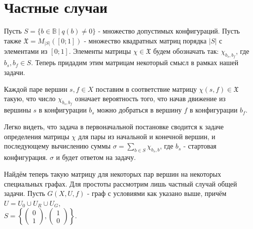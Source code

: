 \section*{Частные случаи}
\par Пусть $S =\{b \in \mathbb{B}\ |\ q(b)\ne 0\}$ - множество допустимых конфигураций. Пусть также $\mathfrak{X} = M_{|S|}([0;1])$ - множество квадратных матриц порядка $|S|$ с элементами из $[0;1]$. Элементы матрицы $\chi \in \mathfrak{X}$ будем обозначать так: $\chi_{b_s,b_f}$, где $b_s, b_f \in S$. Теперь придадим этим матрицам некоторый смысл в рамках нашей задачи. 
\par Каждой паре вершин $s, f \in X$ поставим в соответствие матрицу $\chi(s,f) \in \mathfrak{X}$ такую, что число $\chi_{b_s,b_f}$ означает вероятность того, что начав движение из вершины $s$ в конфигурации $b_s$ можно добраться в вершину $f$ в конфигурации $b_f$. 
\par Легко видеть, что задача в первоначальной постановке сводится к задаче определения матрицы $\chi$ для пары из начальной и конечной вершин, и последующему вычислению суммы $\sigma = \sum\limits_{b\in S} \chi_{b_s,b}$, где $b_s$ - стартовая конфигурация. $\sigma$ и будет ответом на задачу.
\par Найдём теперь такую матрицу для некоторых пар вершин на некоторых специальных графах. Для простоты рассмотрим лишь частный случай общей задачи. Пусть $G(X, U, f)$ - граф с условиями как указано выше, причём $U = U_0 \cup U_R \cup U_G$,\\ $S = \left\{\begin{pmatrix}
0\\ 
1
\end{pmatrix},
\begin{pmatrix}
1\\ 
0
\end{pmatrix}
 \right\}$. 